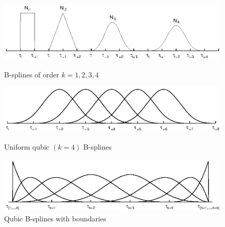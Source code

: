 \documentclass{article}
\theoremstyle{plain}\newtheorem{thm}{Theorem}
\theoremstyle{definition}\newtheorem{defn}[thm]{Definition}
\begin{document}
\begin{figure}[h]

	\begin{center}
		\includegraphics[width=12cm]{ni1234}
		\caption{B-splines of order $k=1,2,3,4$}
	\end{center}

	\begin{center}
		\includegraphics[width=12cm]{ni4-free}
		\caption{Uniform qubic $(k=4)$ B-splines}
	\end{center}

	\begin{center}
		\includegraphics[width=12cm]{ni4-bound}
		\caption{Qubic B-splines with boundaries}
	\end{center}

\end{figure}
	
\end{document}
